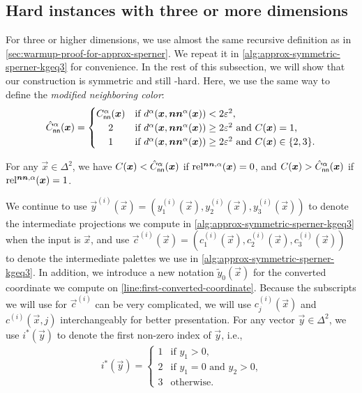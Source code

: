 \subsection{Hard instances with three or more dimensions}
\label{subsec:symmetric-kd}
For three or higher dimensions, we use almost the same recursive definition as in \cref{sec:warmup-proof-for-approx-sperner}.
We repeat it in \cref{alg:approx-symmetric-sperner-kgeq3} for convenience. 
In the rest of this subsection, we will show that our construction is symmetric and still \PPAD-hard.
Here, we use the same way to define the {\em modified neighboring color}:
\begin{align}
    \label{eqn:modified-neighboring-color-symmetry}
    \hat{C}^\alpha_{\sf nn}(\vec{x}) = \begin{cases}
        C^\alpha_{\sf nn}(\vec{x}) & \text{if $d^\alpha(\vec{x}, \nna(\vec{x}))< 2\eps^2$,}\\
        \hfill 2 \hfill & \text{if $d^\alpha(\vec{x}, \nna(\vec{x}))\geq 2\eps^2$ and $C(\vec{x})=1$,}\\
        \hfill 1 \hfill & \text{if $d^\alpha(\vec{x}, \nna(\vec{x}))\geq 2\eps^2$ and $C(\vec{x})\in \{2,3\}$.}
    \end{cases}
\end{align}
\begin{fact}
\label{fact:modified-neighboring-color-for-symmetry}
    For any $\vec{x}\in \Delta^2$, we have $C(\vec{x})<\hat{C}^\alpha_{\sf nn}(\vec{x})$ if $\rela(\vec{x})=0$, and $C(\vec{x})>\hat{C}^\alpha_{\sf nn}(\vec{x})$ if $\rela(\vec{x})=1$.
\end{fact}


We continue to use $\vec{y}^{(i)}(\vec{x}) = (y^{(i)}_1(\vec{x}), y^{(i)}_2(\vec{x}), y^{(i)}_3(\vec{x}))$
to denote the intermediate projections we compute in \cref{alg:approx-symmetric-sperner-kgeq3} when the input is $\vec{x}$, and use
$\vec{c}^{(i)}(\vec{x}) = (c^{(i)}_1(\vec{x}), c^{(i)}_2(\vec{x}), c^{(i)}_3(\vec{x}))$ 
to denote the intermediate palettes we use in \cref{alg:approx-symmetric-sperner-kgeq3}.
In addition, we introduce a new notation $\tilde{y}_0(\vec{x})$ for the converted coordinate we compute on \cref{line:first-converted-coordinate}.
Because the subscripts we will use for $\vec{c}^{(i)}$ can be very complicated, we will use $c_j^{(i)}(\vec{x})$ and $c^{(i)}(\vec{x}, j)$ interchangeably for better presentation.
For any vector $\vec{y}\in \Delta^2$, we use $i^*(\vec{y})$ to denote the first non-zero index of $\vec{y}$, i.e., 
\begin{align*}
    i^*(\vec{y}) = \begin{cases}
        1 & \text{if $y_1>0$,}\\
        2 & \text{if $y_1=0$ and $y_2>0$,}\\
        3 & \text{otherwise.}
    \end{cases}
\end{align*}

